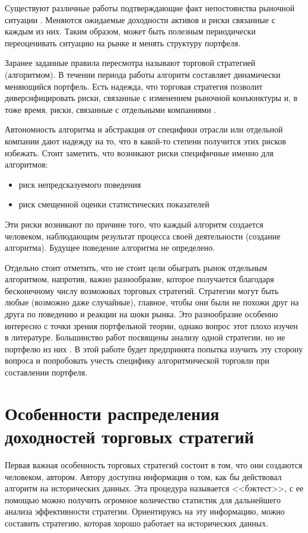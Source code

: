 Существуют различные работы подтверждающие факт непостоянства рыночной ситуации \citep{billio2003, koutmos2012}. Меняются ожидаемые доходности активов и риски связанные с каждым из них. Таким образом, может быть полезным периодически переоценивать ситуацию на рынке и менять структуру портфеля.

Заранее заданные правила пересмотра называют торговой стратегией (алгоритмом). В течении периода работы алгоритм составляет динамически меняющийся портфель. Есть надежда, что торговая стратегия позволит диверсифицировать риски, связанные с изменением рыночной конъюнктуры и, в тоже время, риски, связанные с отдельными компаниями \citep{lorenz2008thesis}.

Автономность алгоритма и абстракция от специфики отрасли или отдельной компании дают надежду на то, что в какой-то степени получится этих рисков избежать. Стоит заметить, что возникают риски специфичные именно для алгоритмов:
\begin{itemize}
	\item риск непредсказуемого поведения
	\item риск смещенной оценки статистических показателей
\end{itemize}
Эти риски возникают по причине того, что каждый алгоритм создается человеком, наблюдающим результат процесса своей деятельности (создание алгоритма). Будущее поведение алгоритма не определено.

Отдельно стоит отметить, что не стоит цели обыграть рынок отдельным алгоритмом, напротив, важно разнообразие, которое получается благодаря бесконечному числу возможных торговых стратегий. Стратегии могут быть любые (возможно даже случайные), главное, чтобы они были не похожи друг на друга по поведению и реакции на шоки рынка. Это разнообразие особенно интересно с точки зрения портфельной теории, однако вопрос этот плохо изучен в литературе. Большинство работ посвящены анализу одной стратегии, но не портфелю из них \citep{lorenz2008thesis, nuti2011}. В этой работе будет предпринята попытка изучить эту сторону вопроса и попробовать учесть специфику алгоритмической торговли при составлении портфеля.

\section{Особенности распределения доходностей торговых стратегий}
Первая важная особенность торговых стратегий состоит в том, что они создаются человеком, автором. Автору доступна информация о том, как бы действовал алгоритм на исторических данных. Эта процедура называется <<бэктест>>, с ее помощью можно получить огромное количество статистик для дальнейшего анализа эффективности стратегии. Ориентируясь на эту информацию, можно составить стратегию, которая хорошо работает на исторических данных. 

